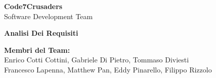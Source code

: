 \documentclass{article}
\begin{document}
\begin{titlepage}
    {\Huge \textbf{Code7Crusaders}}\\
    \vspace{0.5cm}
    {\Large Software Development Team}\\
    \vspace{2cm}
    
    \large \textbf{Analisi Dei Requisiti}
    \vspace{3.9cm}

    \textbf{Membri del Team:}\\
    Enrico Cotti Cottini, Gabriele Di Pietro, Tommaso Diviesti \\
    Francesco Lapenna, Matthew Pan, Eddy Pinarello, Filippo Rizzolo \\
    \vspace{0.5cm}
    
    \vspace{1cm}
\end{titlepage}
\end{document}
